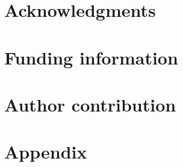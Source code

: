 \documentclass[a4paper, 11pt]{article}
\begin{document}
\newpage
\section{Acknowledgments}

\section{Funding information}

\section{Author contribution}



\newpage
\section*{Appendix}
\end{document}
